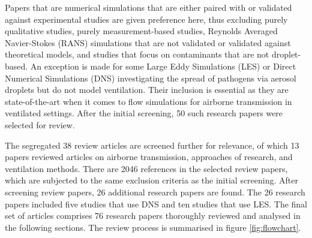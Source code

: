 \documentclass[a4paper,12pt]{elsarticle}
\begin{document}
Papers that are numerical simulations that are either paired with or validated against experimental studies are given preference here, thus excluding purely qualitative studies, purely measurement-based studies, Reynolds Averaged Navier-Stokes (RANS) simulations that are not validated or validated against theoretical models, and studies that focus on contaminants that are not droplet-based. An exception is made for some Large Eddy Simulations (LES) or Direct Numerical Simulations (DNS) investigating the spread of pathogens via aerosol droplets but do not model ventilation. Their inclusion is essential as they are state-of-the-art when it comes to flow simulations for airborne transmission in ventilated settings. After the initial screening, 50 such research papers were selected for review. 

The segregated 38 review articles are screened further for relevance, of which 13 papers reviewed articles on airborne transmission, approaches of research, and ventilation methods. There are 2046 references in the selected review papers, which are subjected to the same exclusion criteria as the initial screening. After screening review papers, 26 additional research papers are found. The 26 research papers included five studies that use DNS and ten studies that use LES. The final set of articles comprises 76 research papers thoroughly reviewed and analysed in the following sections. The review process is summarised in figure \ref{fig:flowchart}.
\end{document}
